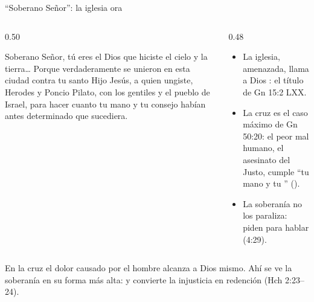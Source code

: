 \begin{frame}{``Soberano Señor'': la iglesia ora}
\begin{columns}[t,onlytextwidth]
\begin{column}{0.50\textwidth}
\begin{cita}Soberano Señor, tú eres el Dios que hiciste el cielo y la tierra\ldots{} Porque verdaderamente se unieron en esta ciudad contra tu santo Hijo Jesús, a quien ungiste, Herodes y Poncio Pilato, con los gentiles y el pueblo de Israel, para hacer cuanto tu mano y tu consejo habían antes determinado que sucediera.\end{cita}
\end{column}
\begin{column}{0.48\textwidth}\small
\begin{itemize}
\item La iglesia, amenazada, llama a Dios : el título de Gn 15:2 LXX.
\item La cruz es el caso máximo de Gn 50:20: el peor mal humano, el asesinato del Justo, cumple ``tu mano y tu '' ().
\item La soberanía no los paraliza: piden  para hablar (4:29).
\end{itemize}
\end{column}
\end{columns}\par\smallskip
\begin{tcolorbox}[colback=papiro,colframe=dorado,boxrule=1.2pt,arc=3pt]
\small En la cruz el dolor causado por el hombre alcanza a Dios mismo. Ahí se ve la soberanía en su forma más alta:  y convierte la injusticia en redención (Hch 2:23--24).
\end{tcolorbox}
\end{frame}

